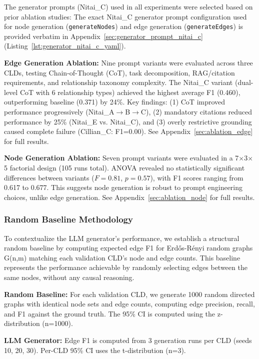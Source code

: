 The generator prompts (Nitai\_C) used in all experiments were selected based on prior ablation studies:
The exact Nitai\_C generator prompt configuration used for node generation (\texttt{generateNodes}) and edge generation (\texttt{generateEdges}) is provided verbatim in Appendix~\ref{sec:generator_prompt_nitai_c} (Listing~\ref{lst:generator_nitai_c_yaml}).

\textbf{Edge Generation Ablation:} Nine prompt variants were evaluated across three CLDs, testing Chain-of-Thought (CoT), task decomposition, RAG/citation requirements, and relationship taxonomy complexity. The Nitai\_C variant (dual-level CoT with 6 relationship types) achieved the highest average F1 (0.460), outperforming baseline (0.371) by 24\%. Key findings: (1) CoT improved performance progressively (Nitai\_A$\rightarrow$B$\rightarrow$C), (2) mandatory citations reduced performance by 25\% (Nitai\_E vs. Nitai\_C), and (3) overly restrictive grounding caused complete failure (Cillian\_C: F1=0.00). See Appendix~\ref{sec:ablation_edge} for full results.

\textbf{Node Generation Ablation:} Seven prompt variants were evaluated in a 7$\times$3$\times$5 factorial design (105 runs total). ANOVA revealed no statistically significant differences between variants ($F=0.81$, $p=0.57$), with F1 scores ranging from 0.617 to 0.677. This suggests node generation is robust to prompt engineering choices, unlike edge generation. See Appendix~\ref{sec:ablation_node} for full results.

\subsubsection{Random Baseline Methodology}

To contextualize the LLM generator's performance, we establish a structural random baseline by computing expected edge F1 for Erd\H{o}s-R\'enyi random graphs G(n,m) matching each validation CLD's node and edge counts. This baseline represents the performance achievable by randomly selecting edges between the same nodes, without any causal reasoning.

\textbf{Random Baseline:} For each validation CLD, we generate 1000 random directed graphs with identical node sets and edge counts, computing edge precision, recall, and F1 against the ground truth. The 95\% CI is computed using the z-distribution (n=1000).

\textbf{LLM Generator:} Edge F1 is computed from 3 generation runs per CLD (seeds 10, 20, 30). Per-CLD 95\% CI uses the t-distribution (n=3).

